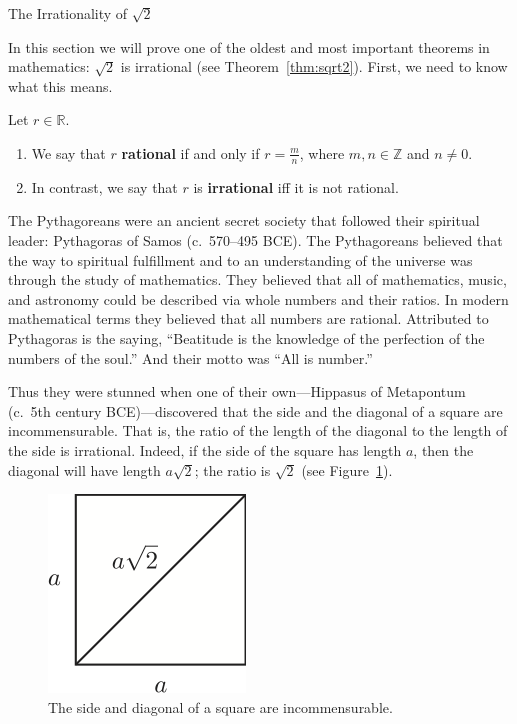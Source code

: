\begin{section}{The Irrationality of $\sqrt{2}$}

In this section we will prove one of the oldest and most important theorems in mathematics: $\sqrt{2}$ is irrational (see Theorem~\ref{thm:sqrt2}). First, we need to know what this means.

\begin{definition}
Let $r\in\mathbb{R}$.
\begin{enumerate}[label=\textrm{(\alph*)}]
\item We say that $r$ \textbf{rational} if and only if $r=\frac{m}{n}$, where $m,n\in\mathbb{Z}$ and $n\neq 0$.  
\item In contrast, we say that $r$ is \textbf{irrational} iff it is not rational.
\end{enumerate} 
\end{definition}

The Pythagoreans were an ancient secret society that followed their spiritual leader: Pythagoras of Samos (c.\ 570--495 BCE). The Pythagoreans believed that the way to spiritual fulfillment and to an understanding of the universe was through the study of mathematics. They believed that all of mathematics, music, and astronomy could be described via whole numbers and their ratios. In modern mathematical terms they believed that all numbers are rational. Attributed to Pythagoras is the saying, ``Beatitude is the knowledge of the perfection of the numbers of the soul.'' And their motto was ``All is number.''

Thus they were stunned when one of their own---Hippasus of Metapontum (c.\ 5th century BCE)---discovered that the side and the diagonal of a square are incommensurable. That is, the ratio of the length of the diagonal to the length of the side is irrational. Indeed, if the side of the square has length $a$, then the diagonal will have length $a\sqrt{2}$; the ratio is $\sqrt{2}$ (see Figure~\ref{fig:square}).

\begin{figure}[ht]
\begin{center}
\includegraphics{square.png}
\end{center}
\vspace{-.5cm}
\caption{The side and diagonal of a square are incommensurable.}
\label{fig:square}
\end{figure}


\end{section}
